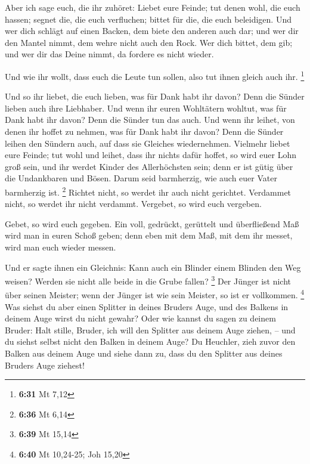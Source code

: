  Aber ich sage euch, die ihr zuhöret: Liebet eure Feinde;
tut denen wohl, die euch hassen;  segnet die, die euch
verfluchen; bittet für die, die euch beleidigen.  Und wer
dich schlägt auf einen Backen, dem biete den anderen auch dar; und wer
dir den Mantel nimmt, dem wehre nicht auch den Rock.  Wer
dich bittet, dem gib; und wer dir das Deine nimmt, da fordere es nicht
wieder.

 Und wie ihr wollt, dass euch die Leute tun sollen, also
tut ihnen gleich auch ihr. \footnote{\textbf{6:31} Mt 7,12}

 Und so ihr liebet, die euch lieben, was für Dank habt
ihr davon? Denn die Sünder lieben auch ihre Liebhaber. 
Und wenn ihr euren Wohltätern wohltut, was für Dank habt ihr davon? Denn
die Sünder tun das auch.  Und wenn ihr leihet, von denen
ihr hoffet zu nehmen, was für Dank habt ihr davon? Denn die Sünder
leihen den Sündern auch, auf dass sie Gleiches wiedernehmen.
 Vielmehr liebet eure Feinde; tut wohl und leihet, dass
ihr nichts dafür hoffet, so wird euer Lohn groß sein, und ihr werdet
Kinder des Allerhöchsten sein; denn er ist gütig über die Undankbaren
und Bösen.  Darum seid barmherzig, wie auch euer Vater
barmherzig ist. \footnote{\textbf{6:36} Mt 6,14}  Richtet
nicht, so werdet ihr auch nicht gerichtet. Verdammet nicht, so werdet
ihr nicht verdammt. Vergebet, so wird euch vergeben.

 Gebet, so wird euch gegeben. Ein voll, gedrückt,
gerüttelt und überfließend Maß wird man in euren Schoß geben; denn eben
mit dem Maß, mit dem ihr messet, wird man euch wieder messen.

 Und er sagte ihnen ein Gleichnis: Kann auch ein Blinder
einem Blinden den Weg weisen? Werden sie nicht alle beide in die Grube
fallen? \footnote{\textbf{6:39} Mt 15,14}  Der Jünger ist
nicht über seinen Meister; wenn der Jünger ist wie sein Meister, so ist
er vollkommen. \footnote{\textbf{6:40} Mt 10,24-25; Joh 15,20}
 Was siehst du aber einen Splitter in deines Bruders
Auge, und des Balkens in deinem Auge wirst du nicht gewahr?
 Oder wie kannst du sagen zu deinem Bruder: Halt stille,
Bruder, ich will den Splitter aus deinem Auge ziehen, -- und du siehst
selbst nicht den Balken in deinem Auge? Du Heuchler, zieh zuvor den
Balken aus deinem Auge und siehe dann zu, dass du den Splitter aus
deines Bruders Auge ziehest!

